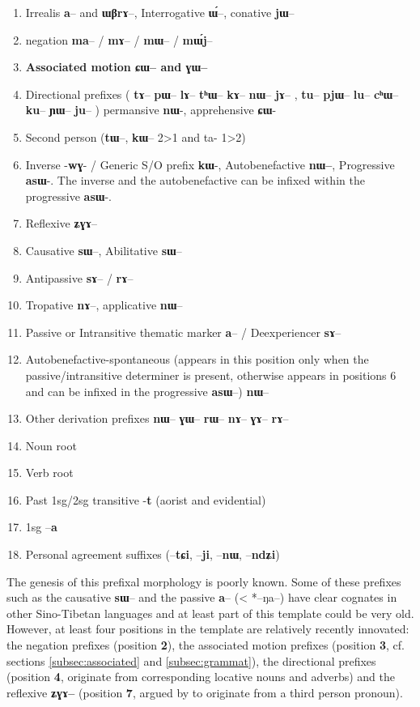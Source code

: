 \documentclass[oldfontcommands,twoside,a4paper,12pt]{article}
\newcommand{\ipa}[1]{{\phon\textbf{#1}}}
\begin{document}
\begin{landscape}
\begin{multicols}{2}
\begin{enumerate}
\item Irrealis  \ipa{a}-- and \ipa{ɯβrɤ}--, Interrogative \ipa{ɯ́}--, conative \ipa{jɯ}--
\item negation \ipa{ma}-- / \ipa{mɤ}-- / \ipa{mɯ}-- / \ipa{mɯ́j}--
\item \textbf{Associated motion \ipa{ɕɯ}-- and \ipa{ɣɯ}--}
\item Directional prefixes ( \ipa{tɤ}--  \ipa{pɯ}--  \ipa{lɤ}--   \ipa{tʰɯ}--  \ipa{kɤ}--   \ipa{nɯ}--   \ipa{jɤ}-- ,  \ipa{tu}--   \ipa{pjɯ}--   \ipa{lu}--   \ipa{cʰɯ}--   \ipa{ku}--   \ipa{ɲɯ}--   \ipa{ju}-- ) permansive  \ipa{nɯ}-, apprehensive \ipa{ɕɯ}-
\item Second person (\ipa{tɯ}--, \ipa{kɯ}-- 2>1 and ta- 1>2)
\item Inverse -\ipa{wɣ}- / Generic S/O prefix \ipa{kɯ}-, Autobenefactive \ipa{nɯ--}, Progressive \ipa{asɯ}-. The inverse and the autobenefactive can be infixed within the progressive \ipa{asɯ}-.
\item Reflexive \ipa{ʑɣɤ}-- 
\item Causative \ipa{sɯ}--, Abilitative \ipa{sɯ}--
\item  Antipassive  \ipa{sɤ}-- / \ipa{rɤ}--
\item  Tropative \ipa{nɤ}--, applicative \ipa{nɯ}--
\item Passive or Intransitive thematic marker \ipa{a}-- / Deexperiencer \ipa{sɤ}--
\item Autobenefactive-spontaneous (appears in this position only when the passive/intransitive determiner is present, otherwise appears in positions 6 and can be infixed in the progressive \ipa{asɯ}--) \ipa{nɯ}--
\item Other derivation prefixes \ipa{nɯ}-- \ipa{ɣɯ}-- \ipa{rɯ}-- \ipa{nɤ}-- \ipa{ɣɤ}-- \ipa{rɤ}--
\item Noun root
\item Verb root 
\item Past 1sg/2sg transitive -\ipa{t} (aorist and evidential)
\item 1sg --\ipa{a}
\item Personal agreement suffixes (--\ipa{tɕi}, --\ipa{ji}, --\ipa{nɯ}, --\ipa{ndʑi})
\end{enumerate}


\end{multicols}
  \end{landscape}


The genesis of this prefixal morphology is poorly known. Some of these prefixes such as the causative \ipa{sɯ}-- and the passive \ipa{a}-- (< *--ŋa--) have clear cognates in other Sino-Tibetan languages and at least part of this template could be very old. However, at least four positions in the template are relatively recently innovated: the negation prefixes (position \textbf{2}), the associated motion prefixes (position \textbf{3}, cf. sections \ref{subsec:associated} and \ref{subsec:grammat}),   the directional prefixes (position \textbf{4}, originate from corresponding locative nouns and adverbs) and  the reflexive \ipa{ʑɣɤ--} (position \textbf{7}, argued by \citet{jacques10refl} to originate from a third person pronoun). 
 
\end{document}
